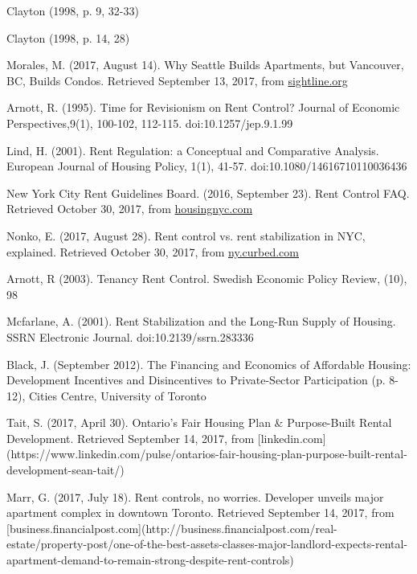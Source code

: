 \begin{thebibliography}{9}
 Clayton (1998, p. 9, 32-33)
  

 Clayton (1998, p. 14, 28) 

  Morales, M. (2017, August 14). Why Seattle Builds Apartments, but Vancouver, BC, Builds Condos. Retrieved September 13, 2017, from \href{http://www.sightline.org/2017/08/14/why-seattle-builds-apartments-but-vancouver-bc-builds-condos/}{sightline.org}


   Arnott, R. (1995). Time for Revisionism on Rent Control? Journal of Economic Perspectives,9(1), 100-102, 112-115. doi:10.1257/jep.9.1.99

  Lind, H. (2001). Rent Regulation: a Conceptual and Comparative Analysis. European Journal of Housing Policy, 1(1), 41-57. doi:10.1080/14616710110036436

  New York City Rent Guidelines Board. (2016, September 23). Rent Control FAQ. Retrieved October 30, 2017, from \href{http://www.housingnyc.com/html/resources/faq/rentcontrol.html}{housingnyc.com}

  Nonko, E. (2017, August 28). Rent control vs. rent stabilization in NYC, explained. Retrieved October 30, 2017, from \href{https://ny.curbed.com/2017/8/28/16214506/nyc-apartments-housing-rent-control}{ny.curbed.com}

  Arnott, R (2003). Tenancy Rent Control. Swedish Economic Policy Review, (10), 98

  Mcfarlane, A. (2001). Rent Stabilization and the Long-Run Supply of Housing. SSRN Electronic Journal. doi:10.2139/ssrn.283336

  Black, J. (September 2012). The Financing and Economics of Affordable Housing: Development Incentives and Disincentives to Private-Sector Participation (p. 8-12), Cities Centre, University of Toronto

  Tait, S. (2017, April 30). Ontario’s Fair Housing Plan \& Purpose-Built Rental Development. Retrieved September 14, 2017, from [linkedin.com](https://www.linkedin.com/pulse/ontarios-fair-housing-plan-purpose-built-rental-development-sean-tait/)

  Marr, G. (2017, July 18). Rent controls, no worries. Developer unveils major apartment complex in downtown Toronto. Retrieved September 14, 2017, from [business.financialpost.com](http://business.financialpost.com/real-estate/property-post/one-of-the-best-assets-classes-major-landlord-expects-rental-apartment-demand-to-remain-strong-despite-rent-controls)


\end{thebibliography}
